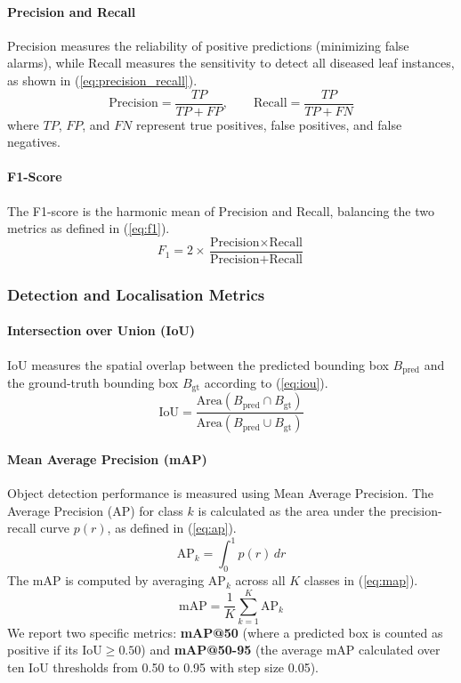 \documentclass[10pt, conference]{IEEEtran}
\begin{document}
\paragraph{Precision and Recall}
Precision measures the reliability of positive predictions (minimizing false alarms), while Recall measures the sensitivity to detect all diseased leaf instances, as shown in (\ref{eq:precision_recall}).
\begin{equation}
    \label{eq:precision_recall}
    \text{Precision} = \frac{TP}{TP + FP}, \qquad \text{Recall} = \frac{TP}{TP + FN}
\end{equation}
where $TP$, $FP$, and $FN$ represent true positives, false positives, and false negatives.

\paragraph{F1-Score}
The F1-score is the harmonic mean of Precision and Recall, balancing the two metrics as defined in (\ref{eq:f1}).
\begin{equation}
    \label{eq:f1}
    F_1 = 2 \times \frac{\text{Precision} \times \text{Recall}}{\text{Precision} + \text{Recall}}
\end{equation}

\subsubsection{Detection and Localisation Metrics}

\paragraph{Intersection over Union (IoU)}
IoU measures the spatial overlap between the predicted bounding box $B_{\text{pred}}$ and the ground-truth bounding box $B_{\text{gt}}$ according to (\ref{eq:iou}).
\begin{equation}
    \label{eq:iou}
    \text{IoU} = \frac{\text{Area}(B_{\text{pred}} \cap B_{\text{gt}})}{\text{Area}(B_{\text{pred}} \cup B_{\text{gt}})}
\end{equation}

\paragraph{Mean Average Precision (mAP)}
Object detection performance is measured using Mean Average Precision. The Average Precision (AP) for class $k$ is calculated as the area under the precision-recall curve $p(r)$, as defined in (\ref{eq:ap}).
\begin{equation}
    \label{eq:ap}
    \text{AP}_k = \int_0^1 p(r)\, dr
\end{equation}
The mAP is computed by averaging $\text{AP}_k$ across all $K$ classes in (\ref{eq:map}).
\begin{equation}
    \label{eq:map}
    \text{mAP} = \frac{1}{K}\sum_{k=1}^{K} \text{AP}_k
\end{equation}
We report two specific metrics: \textbf{mAP@50} (where a predicted box is counted as positive if its $\text{IoU} \ge 0.50$) and \textbf{mAP@50-95} (the average mAP calculated over ten IoU thresholds from 0.50 to 0.95 with step size 0.05).
\end{document}
